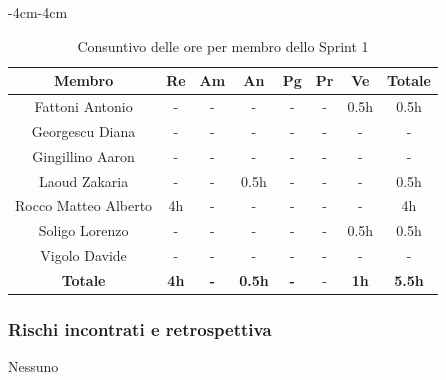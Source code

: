 \documentclass[a4paper,12pt]{article}
\begin{document}
\begin{table}[H]
    \begin{adjustwidth}{-4cm}{-4cm}
    \centering
    \begin{tabular}{|c|c|c|c|c|c|c|c|}
        \hline
        \textbf{Membro} & \textbf{Re} & \textbf{Am} & \textbf{An} & \textbf{Pg} & \textbf{Pr} & \textbf{Ve} & \textbf{Totale} \\
        \hline
        Fattoni Antonio & - & - & - & - & - & 0.5h & 0.5h\\
        \hline
        Georgescu Diana & - & - & - & - & - & - & - \\
        \hline
        Gingillino Aaron & - & - & - & - & - & - & - \\
        \hline
        Laoud Zakaria & - & - & 0.5h & - & - & - & 0.5h \\
        \hline
        Rocco Matteo Alberto& 4h & - & - & - & -& - & 4h \\
        \hline
        Soligo Lorenzo & - & - & - & - & - & 0.5h & 0.5h \\
        \hline
        Vigolo Davide & - & - & - & - & - & - & - \\
        \hline
        \textbf{Totale} & \textbf{4h}& \textbf{-} & \textbf{0.5h}& \textbf{-}& -& \textbf{1h}&  \textbf{5.5h}\\
        \hline
    \end{tabular}
    \caption{Consuntivo delle ore per membro dello Sprint 1}
    \end{adjustwidth}
\end{table}


\subsubsection{Rischi incontrati e retrospettiva}
Nessuno
\end{document}
